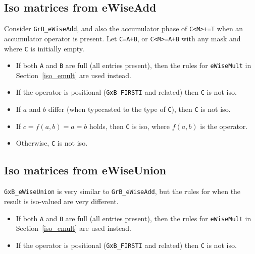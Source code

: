 \documentclass[12pt]{article}
\begin{document}
{%
\subsection{Iso matrices from eWiseAdd}
\label{iso_add}

Consider \verb'GrB_eWiseAdd', and also the accumulator phase of \verb'C<M>+=T'
when an accumulator operator is present.  Let \verb'C=A+B', or \verb'C<M>=A+B'
with any mask and where \verb'C' is initially empty.

    \begin{itemize}
    \item If both \verb'A' and \verb'B' are full (all entries present), then
    the rules for \verb'eWiseMult' in Section~\ref{iso_emult} are used
    instead.

    \item If the operator is positional (\verb'GxB_FIRSTI' and related) then
    \verb'C' is not iso.

    \item If $a$ and $b$ differ (when typecasted to the type of \verb'C'),
    then \verb'C' is not iso.

    \item If $c=f(a,b) = a = b$ holds, then \verb'C' is iso,
    where $f(a,b)$ is the operator.

    \item Otherwise, \verb'C' is not iso.
    \end{itemize}

\subsection{Iso matrices from eWiseUnion}
\label{iso_union}

\verb'GxB_eWiseUnion' is very similar to \verb'GrB_eWiseAdd', but the rules
for when the result is iso-valued are very different.

    \begin{itemize}
    \item If both \verb'A' and \verb'B' are full (all entries present), then
    the rules for \verb'eWiseMult' in Section~\ref{iso_emult} are used
    instead.

    \item If the operator is positional (\verb'GxB_FIRSTI' and related) then
    \verb'C' is not iso.


\end{itemize}}
\end{document}
